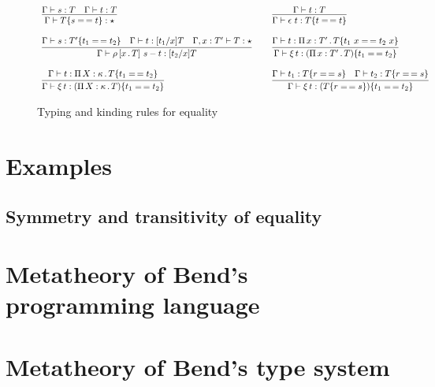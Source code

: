 \documentclass{article}
\begin{document}
\begin{figure}
  \[
  \begin{array}{lll}
    \infer{\Gamma\vdash\eqtm{s}{T}{t} : \star}{\Gamma\vdash s : T & \Gamma\vdash t : T}
    &\ &
\infer{\Gamma\vdash\rfl{t} : \eqtm{t}{T}{t}}{\Gamma\vdash t : T}
\\\\    
\infer{\Gamma\vdash\cng{x}{T}{s}{t} : [t_2/x]T}
          {\Gamma\vdash s : \eqtm{t_1}{T'}{t_2} & \Gamma \vdash t : [t_1/x]T & \Gamma,x:T'\vdash T : \star}
    &\ &
    \infer{\Gamma\vdash\ext{t} : \eqtm{t_1}{(\Pia{x}{T'}{T})}{t_2}}{\Gamma \vdash t : \Pia{x}{T'}{\eqtm{t_1\ x}{T}{t_2\ x}}}
\\ \\
\infer{\Gamma\vdash\ext{t} : \eqtm{t_1}{(\Pia{X}{\kappa}{T})}{t_2}}{\Gamma \vdash t : \Pia{X}{\kappa}{\eqtm{t_1}{T}{t_2}}}
&\ &
\infer{\Gamma\vdash\ext{t} : \eqtm{t_1}{(\eqtm{r}{T}{s})}{t_2}}{\Gamma\vdash t_1 : \eqtm{r}{T}{s} & \Gamma\vdash t_2 : \eqtm{r}{T}{s}}
    \end{array}
  \]
\caption{Typing and kinding rules for equality}
\label{fig:eqtp}
  \end{figure}
  
\section{Examples}



\subsection{Symmetry and transitivity of equality}



\section{Metatheory of Bend's programming language}
\label{sec:opmeta}

\section{Metatheory of Bend's type system}
\label{sec:ttmeta}



\end{document}
